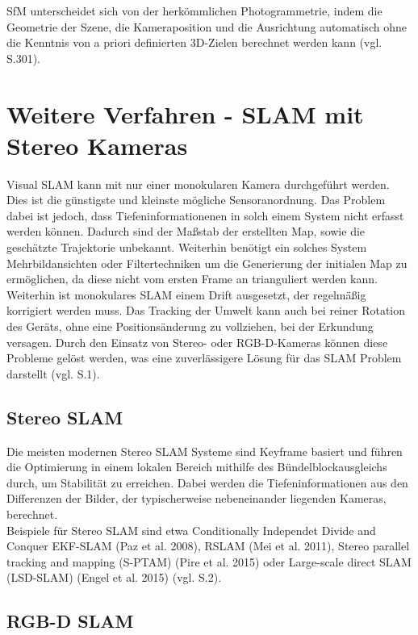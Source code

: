 SfM unterscheidet sich von der herkömmlichen Photogrammetrie, indem die Geometrie der Szene, die Kameraposition und die Ausrichtung automatisch ohne die Kenntnis von a priori definierten 3D-Zielen berechnet werden kann (vgl. \cite{sfm_photo} S.301).

\section{Weitere Verfahren - SLAM mit Stereo Kameras}

Visual SLAM kann mit nur einer monokularen Kamera durchgeführt werden. Dies ist die günstigste und kleinste mögliche Sensoranordnung. Das Problem dabei ist jedoch, dass Tiefeninformationenen in solch einem System nicht erfasst werden können. Dadurch sind der Maßstab der erstellten Map, sowie die geschätzte Trajektorie unbekannt. Weiterhin benötigt ein solches System Mehrbildansichten oder Filtertechniken um die Generierung der initialen Map zu ermöglichen, da diese nicht vom ersten Frame an trianguliert werden kann. Weiterhin ist monokulares SLAM einem Drift ausgesetzt, der regelmäßig korrigiert werden muss. Das Tracking der Umwelt kann auch bei reiner Rotation des Geräts, ohne eine Positionsänderung zu vollziehen, bei der Erkundung versagen. Durch den Einsatz von Stereo- oder RGB-D-Kameras können diese Probleme gelöst werden, was eine zuverlässigere Lösung für das SLAM Problem darstellt (vgl. \cite{orbslam2} S.1).

\subsection{Stereo SLAM}

Die meisten modernen Stereo SLAM Systeme sind Keyframe basiert und führen die Optimierung in einem lokalen Bereich mithilfe des Bündelblockausgleichs durch, um Stabilität zu erreichen. Dabei werden die Tiefeninformationen aus den Differenzen der Bilder, der typischerweise nebeneinander liegenden Kameras, berechnet. \\ Beispiele für Stereo SLAM sind etwa \glqq Conditionally Independet Divide and Conquer EKF-SLAM\grqq{} (Paz et al. 2008), \glqq RSLAM\grqq{} (Mei et al. 2011), \glqq Stereo parallel tracking and mapping (S-PTAM)\grqq{} (Pire et al. 2015) oder \glqq Large-scale direct SLAM (LSD-SLAM)\grqq{} (Engel et al. 2015) (vgl. \cite{orbslam2} S.2).

\subsection{RGB-D SLAM}

